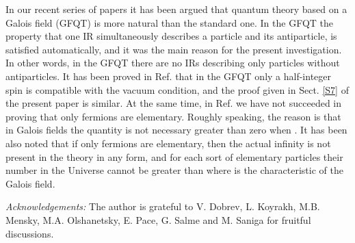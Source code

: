 \documentclass[a4paper,12pt]{article}%
\begin{document}
In our recent series of papers \cite{lev2} 
it has been argued that quantum
theory based on a Galois field (GFQT) is more natural
than the standard one. In the GFQT the property that
one IR simultaneously describes a particle and its
antiparticle, is satisfied automatically, and it was
the main reason for the present investigation. In other
words, in the GFQT there are no IRs describing only 
particles without antiparticles. It has been proved
in Ref. \cite{lev2} that in the GFQT only a half-integer
spin is compatible with the vacuum condition, and the
proof given in Sect. \ref{S7} of the present paper is
similar. At the same time, in Ref. \cite{lev2} we have 
not succeeded in proving that only fermions are 
elementary. Roughly speaking, the reason is that in 
Galois fields the quantity \myHighlight{$\alpha \alpha^*$}\coordHE{} is not 
necessary greater than zero when \coordHE{}.
It has been also noted that if only fermions are 
elementary, then the actual infinity is not present in the
theory in any form, and for each sort of elementary
particles their number in the Universe cannot be 
greater than \coordHE{} where \coordHE{} is the characteristic
of the Galois field.

{\it Acknowledgements: } The author is grateful to 
V. Dobrev, L. Koyrakh, M.B. Mensky, M.A. Olshanetsky,
E. Pace, G. Salme and M. Saniga for fruitful discussions. 
\end{document}
